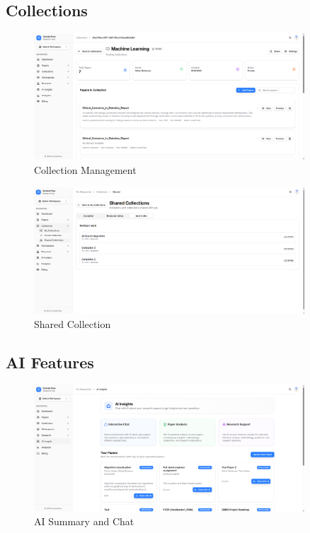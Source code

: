 \subsection{Collections}

\begin{figure}[H]
\centering
\includegraphics[width=0.9\textwidth]{images/screenshots/collection_details.png}
\caption{Collection Management}
\label{fig:ss-collection}
\end{figure}

\begin{figure}[H]
\centering
\includegraphics[width=0.9\textwidth]{images/screenshots/shared_collection.png}
\caption{Shared Collection}
\label{fig:ss-shared-col}
\end{figure}

\subsection{AI Features}

\begin{figure}[H]
\centering
\includegraphics[width=0.9\textwidth]{images/screenshots/ai_insights.png}
\caption{AI Summary and Chat}
\label{fig:ss-ai}
\end{figure}

